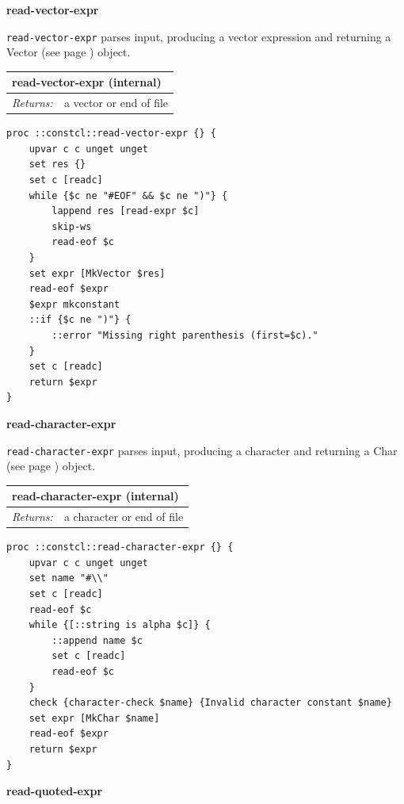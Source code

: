\documentclass[twoside,9pt]{report}
\begin{document}
\textbf{read-vector-expr}


\texttt{read-vector-expr} parses input, producing a vector expression and returning a Vector (see page \pageref{vectors}) object.

\begin{tabular}{ |l l| }
\hline
\multicolumn{2}{|l|}{read-vector-expr (internal)} \\
\hline
\textit{Returns:} & a vector or end of file \\
\hline
\end{tabular}

\noindent\makebox[\linewidth]{\rule{\linewidth}{0.4pt}}
\begin{lstlisting}
proc ::constcl::read-vector-expr {} {
    upvar c c unget unget
    set res {}
    set c [readc]
    while {$c ne "#EOF" && $c ne ")"} {
        lappend res [read-expr $c]
        skip-ws
        read-eof $c
    }
    set expr [MkVector $res]
    read-eof $expr
    $expr mkconstant
    ::if {$c ne ")"} {
        ::error "Missing right parenthesis (first=$c)."
    }
    set c [readc]
    return $expr
}
\end{lstlisting}
\noindent\makebox[\linewidth]{\rule{\linewidth}{0.4pt}}

\textbf{read-character-expr}


\texttt{read-character-expr} parses input, producing a character and returning a Char (see page \pageref{characters}) object.

\begin{tabular}{ |l l| }
\hline
\multicolumn{2}{|l|}{read-character-expr (internal)} \\
\hline
\textit{Returns:} & a character or end of file \\
\hline
\end{tabular}

\noindent\makebox[\linewidth]{\rule{\linewidth}{0.4pt}}
\begin{lstlisting}
proc ::constcl::read-character-expr {} {
    upvar c c unget unget
    set name "#\\"
    set c [readc]
    read-eof $c
    while {[::string is alpha $c]} {
        ::append name $c
        set c [readc]
        read-eof $c
    }
    check {character-check $name} {Invalid character constant $name}
    set expr [MkChar $name]
    read-eof $expr
    return $expr
}
\end{lstlisting}
\noindent\makebox[\linewidth]{\rule{\linewidth}{0.4pt}}

\textbf{read-quoted-expr}
\end{document}
